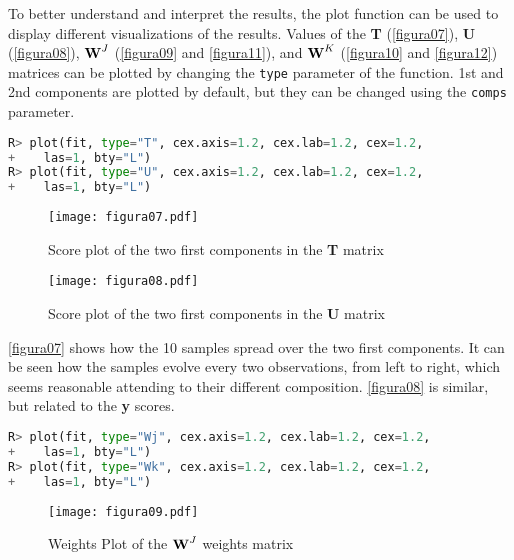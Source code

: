 To better understand and interpret the results, the plot function can be used to display different visualizations of the results. Values of the \textbf{T} (\autoref{figura07}), \textbf{U} (\autoref{figura08}), $\textbf{\text{W}}^{J}$ (\autoref{figura09} and \autoref{figura11}), and $\textbf{\text{W}}^{K}$ (\autoref{figura10} and \autoref{figura12}) matrices can be plotted by changing the \texttt{type} parameter of the function. 1st and 2nd components are plotted by default, but they can be changed using the \texttt{comps} parameter.

\vspace{15pt}
\begin{lstlisting}[basicstyle=\small, language=Python]
R> plot(fit, type="T", cex.axis=1.2, cex.lab=1.2, cex=1.2, 
+    las=1, bty="L")
R> plot(fit, type="U", cex.axis=1.2, cex.lab=1.2, cex=1.2, 
+    las=1, bty="L")
\end{lstlisting}


\begin{figure}[!ht]
\centering
\texttt{[image: figura07.pdf]}
\caption{Score plot of the two first components in the \textbf{T} matrix}
\label{figura07}
\end{figure}

\begin{figure}[!ht]
\centering
\texttt{[image: figura08.pdf]}
\caption{Score plot of the two first components in the \textbf{U} matrix}
\label{figura08}
\end{figure}

\autoref{figura07} shows how the 10 samples spread over the two first components. It can be seen how the samples evolve every two observations, from left to right, which seems reasonable attending to their different composition. \autoref{figura08} is similar, but related to the \textbf{y} scores. 

\vspace{15pt}
\begin{lstlisting}[basicstyle=\small, language=Python]
R> plot(fit, type="Wj", cex.axis=1.2, cex.lab=1.2, cex=1.2, 
+    las=1, bty="L")
R> plot(fit, type="Wk", cex.axis=1.2, cex.lab=1.2, cex=1.2, 
+    las=1, bty="L")
\end{lstlisting}

\begin{figure}[!ht]
\centering
\texttt{[image: figura09.pdf]}
\caption{Weights Plot of the $\textbf{\text{W}}^{J}$ weights matrix}
\label{figura09}
\end{figure}


